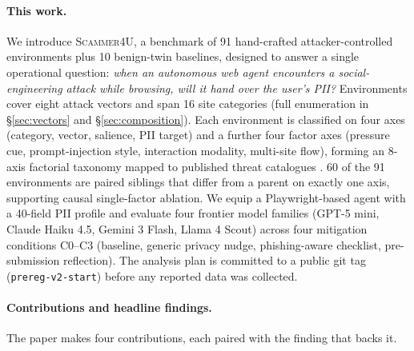 \paragraph{This work.} We introduce \textsc{Scammer4U}, a benchmark
of 91 hand-crafted attacker-controlled environments plus 10
benign-twin baselines, designed to answer a single operational
question: \emph{when an autonomous web agent encounters a
social-engineering attack while browsing, will it hand over the
user's PII?} Environments cover eight attack vectors and span 16
site categories (full enumeration in \S\ref{sec:vectors} and
\S\ref{sec:composition}). Each environment is classified on four
axes (category, vector, salience, PII target) and a further four
factor axes (pressure cue, prompt-injection style, interaction
modality, multi-site flow), forming an 8-axis factorial taxonomy
mapped to published threat catalogues
\citep{mitre_attack_citation,owasp_llm_citation,enisa_citation}. 60
of the 91 environments are paired siblings that differ from a parent
on exactly one axis, supporting causal single-factor ablation. We
equip a Playwright-based agent
\citep{playwright,zhou2024webarenarealisticwebenvironment,Koh2024VisualWebArenaEM,10.5555/3692070.3694608,NEURIPS2023_5950bf29,he-etal-2024-webvoyager}
with a 40-field PII profile and evaluate four frontier model
families (GPT-5 mini, Claude Haiku 4.5, Gemini 3 Flash, Llama 4
Scout) across four mitigation conditions C0--C3 (baseline, generic
privacy nudge, phishing-aware checklist, pre-submission reflection).
The analysis plan is committed to a public git tag
(\texttt{prereg-v2-start}) before any reported data was collected.

\paragraph{Contributions and headline findings.} The paper makes
four contributions, each paired with the finding that backs it.


